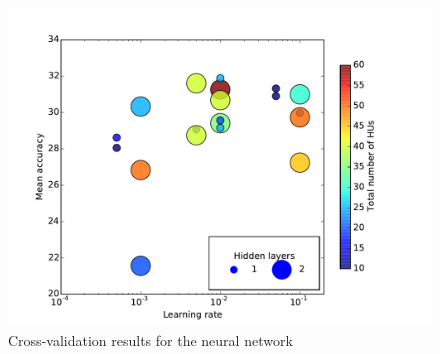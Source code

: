 \documentclass{acm_proc_article-sp}
\begin{document}
\begin{figure}[h!]
	\centering
	\includegraphics[width=\linewidth]{neuralnet_crossval_oddgraph}
	\caption{Cross-validation results for the neural network}
	\label{fig:nn-crossval}
\end{figure}
\end{document}
